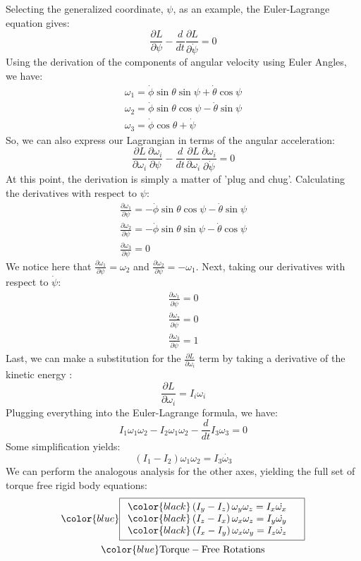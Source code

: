 Selecting the generalized coordinate, $\psi$, as an example, the Euler-Lagrange equation gives:
$$\frac{\partial L}{\partial \psi}-\frac{d}{dt}\frac{\partial L}{\partial \dot{\psi}}=0$$
Using the derivation of the components of angular velocity using Euler Angles, we have:
\begin{gather}
\omega_1=\dot{\phi}\sin\theta\sin\psi+\dot{\theta}\cos\psi\\
    \omega_2=\dot{\phi}\sin\theta\cos\psi-\dot{\theta}\sin\psi\\
    \omega_3=\dot{\phi}\cos\theta+\dot{\psi}
\end{gather}
So, we can also express our \gls{Lagrangian} in terms of the angular acceleration:
$$\frac{\partial L}{\partial \omega_i}\frac{\partial \omega_i}{\partial \psi}-\frac{d}{dt}\frac{\partial L}{\partial \omega_i}\frac{\partial \omega_i}{\partial \dot{\psi}}=0$$
At this point, the derivation is simply a matter of 'plug and chug'. Calculating the derivatives with respect to $\psi$:
\begin{gather}
    \frac{\partial \omega_1}{\partial \psi}=-\dot{\phi}\sin\theta\cos\psi-\dot{\theta}\sin\psi\\
    \frac{\partial \omega_2}{\partial \psi}=-\dot{\phi}\sin\theta\sin\psi-\dot{\theta}\cos\psi\\
    \frac{\partial \omega_3}{\partial \psi}=0
\end{gather}
We notice here that $\frac{\partial \omega_1}{\partial \psi}=\omega_2$ and $\frac{\partial \omega_2}{\partial \psi}=-\omega_1$. Next, taking our derivatives with respect to $\dot{\psi}$:
\begin{gather}
    \frac{\partial \omega_1}{\partial \dot{\psi}}=0\\
    \frac{\partial \omega_2}{\partial \dot{\psi}}=0\\
    \frac{\partial \omega_3}{\partial \dot{\psi}}=1
\end{gather}
Last, we can make a substitution for the $\frac{\partial L}{\partial \omega_i}$ term by taking a derivative of the kinetic energy :
$$\frac{\partial L}{\partial \omega_i}=I_i\omega_i$$
Plugging everything into the Euler-Lagrange formula, we have:
$$I_1\omega_1\omega_2-I_2\omega_1\omega_2-\frac{d}{dt}I_3\omega_3=0$$
Some simplification yields:
$$\left(I_1-I_2\right)\omega_1\omega_2=I_3\dot{\omega_3}$$
We can perform the analogous analysis for the other axes, yielding the full set of torque free \gls{rigid body} equations:
\begin{gather}
\color{blue}\boxed{
\begin{array}{ll}
\color{black}
\left(I_y-I_z\right)\omega_y\omega_z=I_x\dot{\omega_x}
     &\\
     \color{black}\left(I_z-I_x\right)\omega_x\omega_z=I_y\dot{\omega_y}
     &\\
     \color{black}\left(I_x-I_y\right)\omega_x\omega_y=I_z\dot{\omega_z}
\end{array}}\\
\color{blue}
\mathrm{Torque-Free \ Rotations}
\end{gather}
